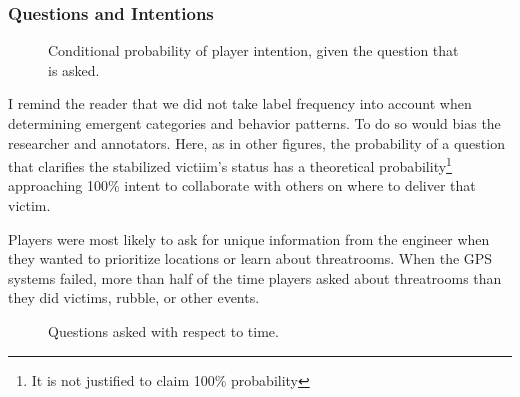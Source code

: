 \documentclass[10pt]{article}
\begin{document}
\clearpage
\subsubsection{Questions and Intentions}
\begin{figure}[h!]
    \centering
    \caption{ Conditional probability of player intention, given the question that is asked.}
\end{figure}

I remind the reader that we did not take label frequency into account when determining emergent categories and behavior patterns. To do so would bias the researcher and annotators. Here, as in other figures, the probability of a question that clarifies the stabilized victiim's status has a theoretical probability\footnote{It is not justified to claim 100\% probability} approaching 100\% intent to collaborate with others on where to deliver that victim.

Players were most likely to ask for unique information from the engineer when they wanted to prioritize locations or learn about threatrooms. When the GPS systems failed, more than half of the time players asked about threatrooms than they did victims, rubble, or other events.




\clearpage

\begin{figure}[h!]
    \centering
    \caption{Questions asked with respect to time.}
    \end{figure}
    
\end{document}
